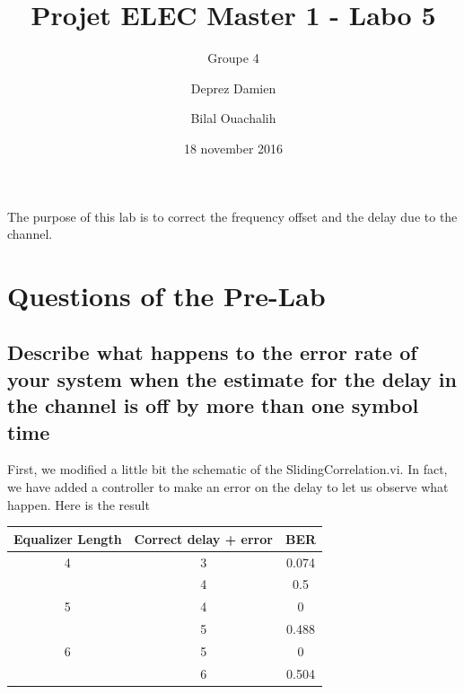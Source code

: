 \documentclass[frenchb, oneside, headings=normal]{scrartcl}
\begin{document}
\title{Projet ELEC Master 1 - Labo 5}
\subtitle{Groupe 4}
\author{Deprez Damien \and Bilal Ouachalih }
\date{18 november 2016}
\maketitle

The purpose of this lab is to correct the frequency offset and the delay due to the channel.

\section{Questions of the Pre-Lab}

\subsection{Describe what happens to the error rate of your system when the estimate for the delay in the channel is off by more than one symbol time}

First, we modified a little bit the schematic of the SlidingCorrelation.vi. In fact, we have added a controller to make an error on the delay to let us observe what happen. Here is the result\\

\begin{center}
	\begin{tabular}{c|c|c}
		 Equalizer Length & Correct delay + error & BER\\
		\hline
		 4& 3 & 0.074\\
		  & 4 & 0.5 \\
		  \hline
		 5 & 4  & 0  \\
		   & 5  & 0.488  \\
		  \hline
		6 & 5  & 0 \\
		 &  6  & 0.504 \\   
	\end{tabular}
	\label{BER_equ_length_4}
    \end{center}
\end{document}
